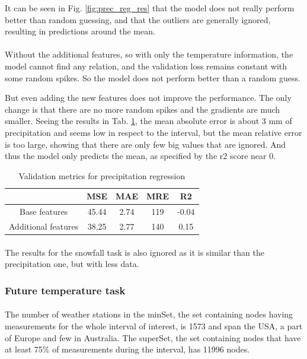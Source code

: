 \documentclass[11pt]{report}
\begin{document}
It can be seen in Fig. \ref{fig:prec_reg_res} that the model does not really perform better than random guessing, and that the outliers are generally ignored, resulting in predictions around the mean.

\paragraph*{}
Without the additional features, so with only the temperature information, the model cannot find any relation, and the validation loss remains constant with some random spikes. So the model does not perform better than a random guess.

But even adding the new features does not improve the performance. The only change is that there are no more random spikes and the gradients are much smaller. Seeing the results in Tab. \ref{tab:prec_metrics}, the mean absolute error is about 3 mm of precipitation and seems low in respect to the interval, but the mean relative error is too large, showing that there are only few big values that are ignored. And thus the model only predicts the mean, as specified by the r2 score near 0.

\begin{table}[!ht]
    \centering
    \begin{tabular}{c|cccc}
         & MSE & MAE & MRE & R2 \\ \hline
    Base features & 45.44 & 2.74 & 119 & -0.04 \\
    Additional features & 38.25 & 2.77 & 140 & 0.15
    \end{tabular}
    \caption{Validation metrics for precipitation regression}
    \label{tab:prec_metrics}
\end{table}

\paragraph*{}
The results for the snowfall task is also ignored as it is similar than the precipitation one, but with less data.

\subsubsection{Future temperature task}
\paragraph*{}
The number of weather stations in the minSet, the set containing nodes having measurements for the whole interval of interest, is 1573 and span the USA, a part of Europe and few in Australia. The superSet, the set containing nodes that have at least 75\% of measurements during the interval, has 11996 nodes.
\end{document}
